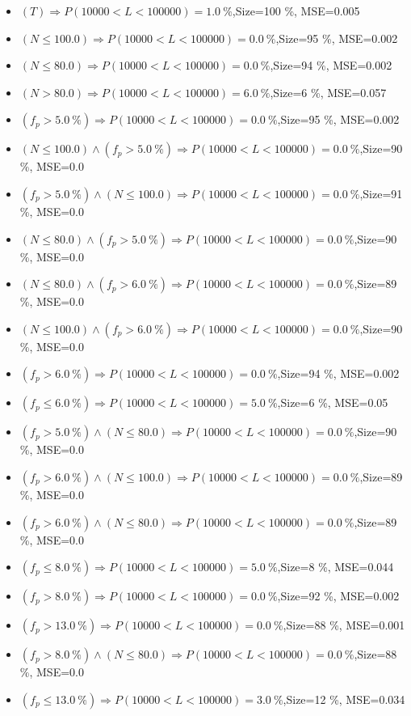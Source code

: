 \documentclass[numbered]{CSL}
\begin{document}
\begin{itemize}
\item $(T) \Rightarrow P(10 000 < L < 100 000) = 1.0~\%$,\hfill Size=100 \%, MSE=0.005
\item $(N \leq 100.0) \Rightarrow P(10 000 < L < 100 000) = 0.0~\%$,\hfill Size=95 \%, MSE=0.002
\item $(N \leq 80.0) \Rightarrow P(10 000 < L < 100 000) = 0.0~\%$,\hfill Size=94 \%, MSE=0.002
\item $(N > 80.0) \Rightarrow P(10 000 < L < 100 000) = 6.0~\%$,\hfill Size=6 \%, MSE=0.057
\item $(f_p > 5.0~\%) \Rightarrow P(10 000 < L < 100 000) = 0.0~\%$,\hfill Size=95 \%, MSE=0.002
\item $(N \leq 100.0) \land (f_p > 5.0~\%) \Rightarrow P(10 000 < L < 100 000) = 0.0~\%$,\hfill Size=90 \%, MSE=0.0
\item $(f_p > 5.0~\%) \land (N \leq 100.0) \Rightarrow P(10 000 < L < 100 000) = 0.0~\%$,\hfill Size=91 \%, MSE=0.0
\item $(N \leq 80.0) \land (f_p > 5.0~\%) \Rightarrow P(10 000 < L < 100 000) = 0.0~\%$,\hfill Size=90 \%, MSE=0.0
\item $(N \leq 80.0) \land (f_p > 6.0~\%) \Rightarrow P(10 000 < L < 100 000) = 0.0~\%$,\hfill Size=89 \%, MSE=0.0
\item $(N \leq 100.0) \land (f_p > 6.0~\%) \Rightarrow P(10 000 < L < 100 000) = 0.0~\%$,\hfill Size=90 \%, MSE=0.0
\item $(f_p > 6.0~\%) \Rightarrow P(10 000 < L < 100 000) = 0.0~\%$,\hfill Size=94 \%, MSE=0.002
\item $(f_p \leq 6.0~\%) \Rightarrow P(10 000 < L < 100 000) = 5.0~\%$,\hfill Size=6 \%, MSE=0.05
\item $(f_p > 5.0~\%) \land (N \leq 80.0) \Rightarrow P(10 000 < L < 100 000) = 0.0~\%$,\hfill Size=90 \%, MSE=0.0
\item $(f_p > 6.0~\%) \land (N \leq 100.0) \Rightarrow P(10 000 < L < 100 000) = 0.0~\%$,\hfill Size=89 \%, MSE=0.0
\item $(f_p > 6.0~\%) \land (N \leq 80.0) \Rightarrow P(10 000 < L < 100 000) = 0.0~\%$,\hfill Size=89 \%, MSE=0.0
\item $(f_p \leq 8.0~\%) \Rightarrow P(10 000 < L < 100 000) = 5.0~\%$,\hfill Size=8 \%, MSE=0.044
\item $(f_p > 8.0~\%) \Rightarrow P(10 000 < L < 100 000) = 0.0~\%$,\hfill Size=92 \%, MSE=0.002
\item $(f_p > 13.0~\%) \Rightarrow P(10 000 < L < 100 000) = 0.0~\%$,\hfill Size=88 \%, MSE=0.001
\item $(f_p > 8.0~\%) \land (N \leq 80.0) \Rightarrow P(10 000 < L < 100 000) = 0.0~\%$,\hfill Size=88 \%, MSE=0.0
\item $(f_p \leq 13.0~\%) \Rightarrow P(10 000 < L < 100 000) = 3.0~\%$,\hfill Size=12 \%, MSE=0.034
\end{itemize}
\end{document}
